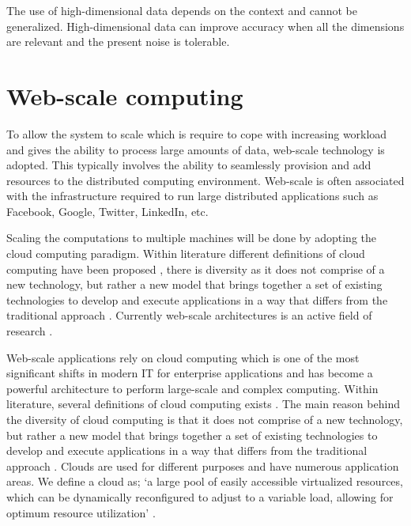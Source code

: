The use of high-dimensional data depends on the context and cannot be generalized. High-dimensional data can improve accuracy when all the dimensions are relevant and the present noise is tolerable.


\section{Web-scale computing \label{sec2:webscale}}

To allow the system to scale which is require to cope with increasing workload and gives the ability to process large amounts of data, web-scale technology is adopted. This typically involves the ability to seamlessly provision and add resources to the distributed computing environment. Web-scale is often associated with the infrastructure required to run large distributed applications such as Facebook, Google, Twitter, LinkedIn, etc. 

Scaling the computations to multiple machines will be done by adopting the cloud computing paradigm. Within literature different definitions of cloud computing have been proposed \cite{clouddef}, there is diversity as it does not comprise of a new technology, but rather a new model that brings together a set of existing technologies to develop and execute applications in a way that differs from the traditional approach \cite{zhang:cloud}. Currently web-scale architectures is an active field of research \cite{cherniack2003scalable}.

Web-scale applications rely on cloud computing which is one of the most significant shifts in modern IT for enterprise applications and has become a powerful architecture to perform large-scale and complex computing. Within literature, several definitions of cloud computing exists \cite{sathyavani}. The main reason behind the diversity of cloud computing is that it does not comprise of a new technology, but rather a new model that brings together a set of existing technologies to develop and execute applications in a way that differs from the traditional approach \cite{zhang:cloud}. Clouds are used for different purposes and have numerous application areas. We define a cloud as; `a large pool of easily accessible virtualized resources, which can be dynamically reconfigured to adjust to a variable load, allowing for optimum resource utilization' \cite{Vaquero:2008:BCT:1496091.1496100}. 


